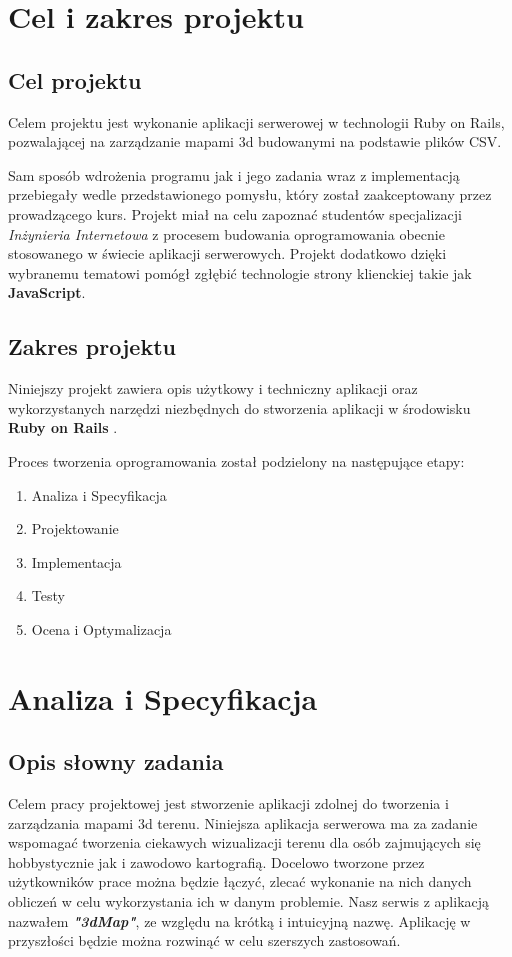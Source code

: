 \chapter{Cel i zakres projektu}
\section{Cel projektu}
Celem projektu jest wykonanie aplikacji serwerowej w technologii Ruby on Rails, pozwalającej na zarządzanie mapami 3d budowanymi na podstawie plików CSV.

Sam sposób wdrożenia programu jak i jego zadania wraz z implementacją przebiegały wedle przedstawionego pomysłu, który został zaakceptowany przez prowadzącego kurs.
Projekt miał na celu zapoznać studentów specjalizacji \textit{Inżynieria Internetowa} z procesem
budowania oprogramowania obecnie stosowanego w świecie aplikacji serwerowych.
Projekt dodatkowo dzięki wybranemu tematowi pomógł zgłębić technologie strony klienckiej
takie jak \textbf{JavaScript}.

\section{Zakres projektu}
Niniejszy projekt zawiera opis użytkowy i techniczny aplikacji oraz wykorzystanych narzędzi niezbędnych do stworzenia aplikacji w środowisku \textbf{Ruby on Rails} .

Proces tworzenia oprogramowania został podzielony na następujące etapy:

\begin{enumerate}
  \item{Analiza i Specyfikacja}
  \item{Projektowanie}
  \item{Implementacja}
  \item{Testy}
  \item{Ocena i Optymalizacja}
\end{enumerate}

\chapter{Analiza i Specyfikacja}
\section{Opis słowny zadania}
Celem pracy projektowej jest stworzenie aplikacji zdolnej do tworzenia i zarządzania mapami 3d terenu.
Niniejsza aplikacja serwerowa ma za zadanie wspomagać tworzenia ciekawych wizualizacji terenu dla osób zajmujących się hobbystycznie jak i zawodowo kartografią.
Docelowo tworzone przez użytkowników prace można będzie łączyć, zlecać wykonanie na nich danych obliczeń w celu wykorzystania ich w danym problemie.
Nasz serwis z aplikacją nazwałem \textbf{\textit{"3dMap"}}, ze względu na krótką i intuicyjną nazwę. Aplikację w przyszłości będzie można rozwinąć w celu szerszych zastosowań.

